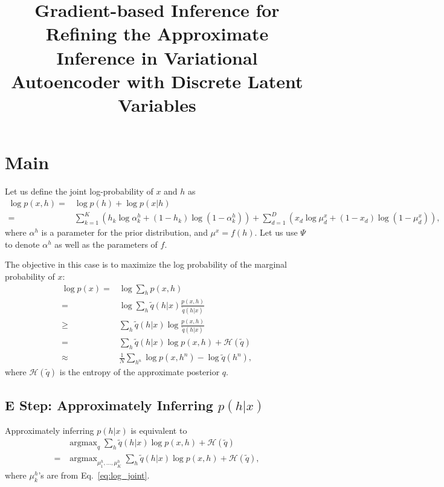 \documentclass{article}
\newcommand{\HH}[0]{\mathcal{H}}
\DeclareMathOperator*{\argmax}{\arg \max}
\begin{document}
\title{Gradient-based Inference for Refining the Approximate Inference in
Variational Autoencoder with Discrete Latent Variables}
\author{}

\maketitle
{}

\section{Main}

Let us define the joint log-probability of $x$ and $h$ as
\begin{align}
    \label{eq:log_joint}
    \log p(x, h) =& \log p(h) + \log p(x|h) \\
    =& 
    \sum_{k=1}^K (h_k \log \alpha^h_k + (1 - h_k) \log (1 - \alpha^h_k))
    + \sum_{d=1}^D (x_d \log \mu^x_d + (1 - x_d) \log (1 - \mu^x_d)),
\end{align}
where $\alpha^h$ is a parameter for the prior distribution, and $\mu^x = f(h)$. Let
us use $\Psi$ to denote $\alpha^h$ as well as the parameters of $f$.

The objective in this case is to maximize the log probability of the marginal
probability of $x$:
\begin{align}
    \label{eq:approx_logp}
    \log p(x) =& \log \sum_{h} p(x, h) \nonumber \\
    =& \log \sum_h \tilde{q}(h|x) \frac{p(x, h)}{\tilde{q}(h|x)} \nonumber \\
    \geq& \sum_h \tilde{q}(h|x) \log \frac{p(x, h)}{\tilde{q}(h|x)} \nonumber \\
    =& \sum_h \tilde{q}(h|x) \log p(x,h) + \HH(\tilde{q}) \nonumber \\
    \approx& \frac{1}{N} \sum_{h^n} \log p(x, h^n) - \log
    \tilde{q}(h^n),
\end{align}
where $\HH(\tilde{q})$ is the entropy of the approximate posterior $q$.

\subsection{E Step: Approximately Inferring $p(h|x)$}

Approximately inferring $p(h|x)$ is equivalent to 
\begin{align*}
    &\argmax_{q}  \sum_h \tilde{q}(h|x) \log p(x,h) + \HH(\tilde{q}) \\
    =& \argmax_{\mu^h_1, \ldots, \mu^h_K} \sum_h \tilde{q}(h|x) \log p(x,h) + \HH(\tilde{q}),
\end{align*}
where $\mu^h_k$'s are from Eq.~\eqref{eq:log_joint}.
\end{document}
